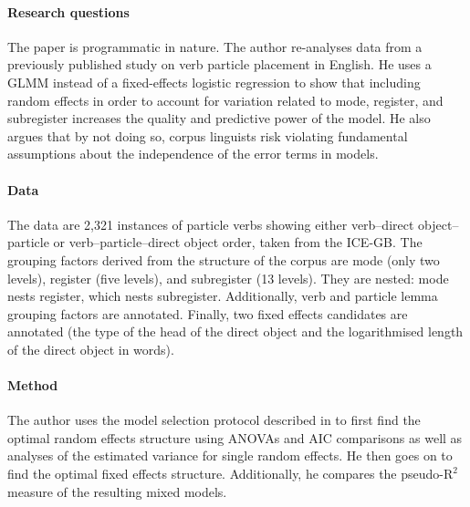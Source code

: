 \begin{svgraybox}
  \textbf{\citet{Gries2015}}

  \vspace{-\baselineskip}\paragraph{Research questions}\vspace{-0.5\baselineskip}
  
  The paper is programmatic in nature.
  The author re-analyses data from a previously published study on verb particle placement in English.
  He uses a GLMM instead of a fixed-effects logistic regression to show that including random effects in order to account for variation related to mode, register, and subregister increases the quality and predictive power of the model.
  He also argues that by not doing so, corpus linguists risk violating fundamental assumptions about the independence of the error terms in models.
  
  \vspace{-\baselineskip}\paragraph{Data}\vspace{-0.5\baselineskip}
  
  The data are 2,321 instances of particle verbs showing either verb--direct object--particle or verb--particle--direct object order, taken from the ICE-GB.
  The grouping factors derived from the structure of the corpus are mode (only two levels), register (five levels), and subregister (13 levels).
  They are nested: mode nests register, which nests subregister.
  Additionally, verb and particle lemma grouping factors are annotated.
  Finally, two fixed effects candidates are annotated (the type of the head of the direct object and the logarithmised length of the direct object in words).
 
  \vspace{-\baselineskip}\paragraph{Method}\vspace{-0.5\baselineskip}
  
  The author uses the model selection protocol described in \citet{ZuurEa2009} to first find the optimal random effects structure using ANOVAs and AIC comparisons as well as analyses of the estimated variance for single random effects.
  He then goes on to find the optimal fixed effects structure.
  Additionally, he compares the pseudo-$\mathrm{R}^{\mathrm{2}}$ measure of the resulting mixed models.
 

\end{svgraybox}
